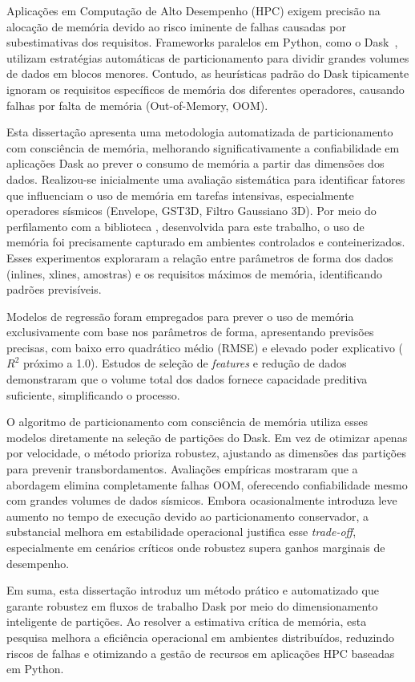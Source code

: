 \begin{resumo}
    Aplicações em Computação de Alto Desempenho (HPC) exigem precisão na alocação de memória devido ao risco iminente de falhas causadas por subestimativas dos requisitos.
    Frameworks paralelos em Python, como o Dask~\cite{Rocklin2015}, utilizam estratégias automáticas de particionamento para dividir grandes volumes de dados em blocos menores.
    Contudo, as heurísticas padrão do Dask tipicamente ignoram os requisitos específicos de memória dos diferentes operadores, causando falhas por falta de memória (Out-of-Memory, OOM).

    Esta dissertação apresenta uma metodologia automatizada de particionamento com consciência de memória, melhorando significativamente a confiabilidade em aplicações Dask ao prever o consumo de memória a partir das dimensões dos dados.
    Realizou-se inicialmente uma avaliação sistemática para identificar fatores que influenciam o uso de memória em tarefas intensivas, especialmente operadores sísmicos (Envelope, \ac{GST3D}, Filtro Gaussiano 3D).
    Por meio do perfilamento com a biblioteca \traceq, desenvolvida para este trabalho, o uso de memória foi precisamente capturado em ambientes controlados e conteinerizados.
    Esses experimentos exploraram a relação entre parâmetros de forma dos dados (inlines, xlines, amostras) e os requisitos máximos de memória, identificando padrões previsíveis.

    Modelos de regressão foram empregados para prever o uso de memória exclusivamente com base nos parâmetros de forma, apresentando previsões precisas, com baixo erro quadrático médio (RMSE) e elevado poder explicativo ($R^2$ próximo a 1.0).
    Estudos de seleção de \emph{features} e redução de dados demonstraram que o volume total dos dados fornece capacidade preditiva suficiente, simplificando o processo.

    O algoritmo de particionamento com consciência de memória utiliza esses modelos diretamente na seleção de partições do Dask.
    Em vez de otimizar apenas por velocidade, o método prioriza robustez, ajustando as dimensões das partições para prevenir transbordamentos.
    Avaliações empíricas mostraram que a abordagem elimina completamente falhas OOM, oferecendo confiabilidade mesmo com grandes volumes de dados sísmicos.
    Embora ocasionalmente introduza leve aumento no tempo de execução devido ao particionamento conservador, a substancial melhora em estabilidade operacional justifica esse \emph{trade-off}, especialmente em cenários críticos onde robustez supera ganhos marginais de desempenho.

    Em suma, esta dissertação introduz um método prático e automatizado que garante robustez em fluxos de trabalho Dask por meio do dimensionamento inteligente de partições.
    Ao resolver a estimativa crítica de memória, esta pesquisa melhora a eficiência operacional em ambientes distribuídos, reduzindo riscos de falhas e otimizando a gestão de recursos em aplicações HPC baseadas em Python.
\end{resumo}

